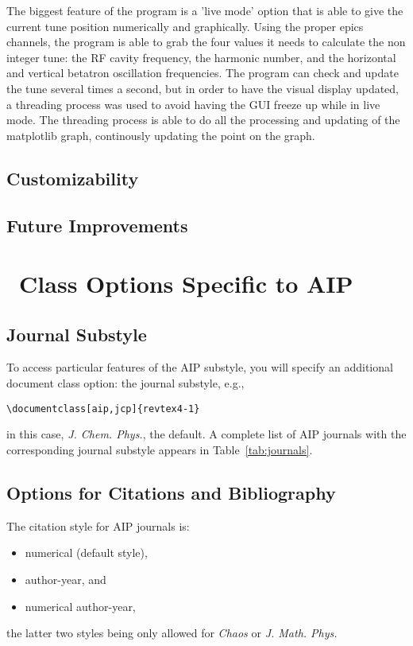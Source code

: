 \documentclass[%
 reprint,%
 amssymb, amsmath,%
 aip,cha,%
]{revtex4-1}
\begin{document}
The biggest feature of the program is a 'live mode' option that is able to give the current tune position numerically and graphically. Using the proper epics channels, the program is able to grab the four values it needs to calculate the non integer tune: the RF cavity frequency, the harmonic number, and the horizontal and vertical betatron oscillation frequencies. The program can check and update the tune several times a second, but in order to have the visual display updated, a threading process was used to avoid having the GUI freeze up while in live mode. The threading process is able to do all the processing and updating of the matplotlib graph, continously updating the point on the graph.



\subsection{Customizability}

\subsection{Future Improvements}

\section{\revtex\ Class Options Specific to AIP}

\subsection{Journal Substyle}
To access particular features of the AIP substyle, you will specify an additional document class option: the journal substyle, e.g.,
\begin{verbatim}
\documentclass[aip,jcp]{revtex4-1}
\end{verbatim}
in this case, \textit{J. Chem. Phys.}, the default. 
A complete list of AIP journals with the corresponding journal substyle appears in Table~\ref{tab:journals}.

\subsection{Options for Citations and Bibliography}
The citation style for AIP journals is:
\begin{itemize}
\item 
numerical (default style), 
\item
author-year, and
\item
numerical author-year,
\end{itemize}
the latter two styles being only allowed for \textit{Chaos} or \textit{J. Math. Phys.}
\end{document}
